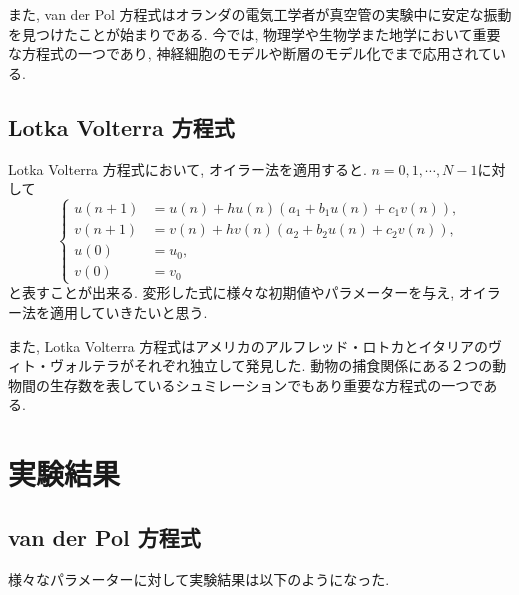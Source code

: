 \documentclass[12pt,a4paper]{jsarticle}
\begin{document}
また, van der Pol 方程式はオランダの電気工学者が真空管の実験中に安定な振動を見つけたことが始まりである. 今では, 物理学や生物学また地学において重要な方程式の一つであり, 神経細胞のモデルや断層のモデル化でまで応用されている.

\subsection{Lotka Volterra 方程式}
Lotka Volterra 方程式において, オイラー法を適用すると. $n = 0, 1, \cdots , N-1$に対して
\begin{equation*}
	\left\{
	\begin{aligned}
		u(n+1) &= u(n) + hu(n)(a_1 + b_1u(n) + c_1v(n)), \\
		v(n+1) &= v(n) + hv(n)(a_2 + b_2u(n) + c_2v(n)), \\
		u(0) &= u_0, \\
		v(0) &= v_0
	\end{aligned}
	\right.
\end{equation*}
と表すことが出来る. 変形した式に様々な初期値やパラメーターを与え, オイラー法を適用していきたいと思う.

また, Lotka Volterra 方程式はアメリカのアルフレッド・ロトカとイタリアのヴィト・ヴォルテラがそれぞれ独立して発見した. 動物の捕食関係にある２つの動物間の生存数を表しているシュミレーションでもあり重要な方程式の一つである.

\section{実験結果}
\subsection{van der Pol 方程式}
様々なパラメーターに対して実験結果は以下のようになった.
\end{document}
